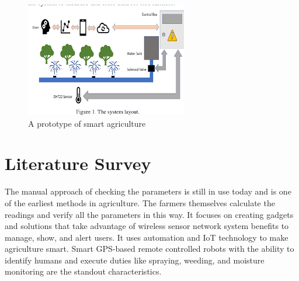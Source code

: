 \documentclass{wsdcr}
\begin{document}
\begin{figure}[t!]
    \centering
    \includegraphics[width=.9\linewidth]{download.png}
    \caption{  A prototype of smart agriculture}
    \label{fig:example}
\end{figure}


\section{Literature Survey}
The manual approach of checking the parameters is still in use today and is one of the earliest methods in agriculture. The farmers themselves calculate the readings and verify all the parameters in this way. It focuses on creating gadgets and solutions that take advantage of wireless sensor network system benefits to manage, show, and alert users. It uses automation and IoT technology to make agriculture smart. Smart GPS-based remote controlled robots with the ability to identify humans and execute duties like spraying, weeding, and moisture monitoring are the standout characteristics.
\end{document}
